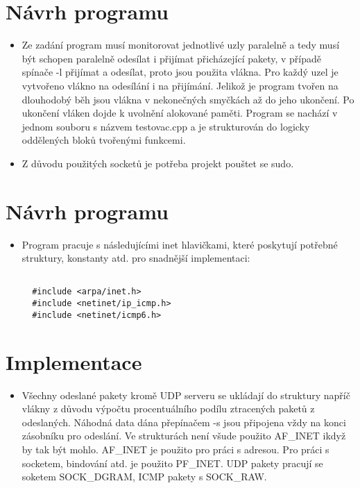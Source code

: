 \documentclass[a4paper,11pt]{article}
\begin{document}
\section*{Návrh programu}
\begin{itemize}
  \item Ze zadání program musí monitorovat jednotlivé uzly paralelně a tedy musí být schopen paralelně odesílat i přijímat přicházející pakety, v případě spínače -l přijímat a odesílat, proto jsou použita vlákna.
  Pro každý uzel je vytvořeno vlákno na odesílání i na přijímání. Jelikož je program tvořen na dlouhodobý běh jsou vlákna v nekonečných smyčkách až do jeho ukončení. Po ukončení vláken dojde k uvolnění alokované paměti.
  Program se nachází v jednom souboru s názvem testovac.cpp a je strukturován do logicky oddělených bloků tvořenými funkcemi.
  \item Z důvodu použitých socketů je potřeba projekt pouštet se sudo.
\end{itemize}

\section*{Návrh programu}
\begin{itemize}
  \item Program pracuje s následujícími inet hlavičkami, které poskytují potřebné struktury, konstanty atd. pro snadnější implementaci:

  \lstset{language=C++}
  \begin{lstlisting}[frame=single,breaklines]

  #include <arpa/inet.h>
  #include <netinet/ip_icmp.h>
  #include <netinet/icmp6.h>

  \end{lstlisting}
\end{itemize}

\section*{Implementace}
\begin{itemize}
  \item Všechny odeslané pakety kromě UDP serveru se ukládají do struktury napříč vlákny z důvodu výpočtu procentuálního podílu ztracených paketů z odeslaných. Náhodná data dána přepínačem -s jsou připojena vždy na konci zásobníku pro odeslání.
  Ve strukturách není všude použito AF\_INET ikdyž by tak být mohlo. AF\_INET je použito pro práci s adresou. Pro práci s socketem, bindování atd. je použito PF\_INET. UDP pakety pracují se soketem SOCK\_DGRAM, ICMP pakety s SOCK\_RAW.
\end{itemize}
\end{document}

